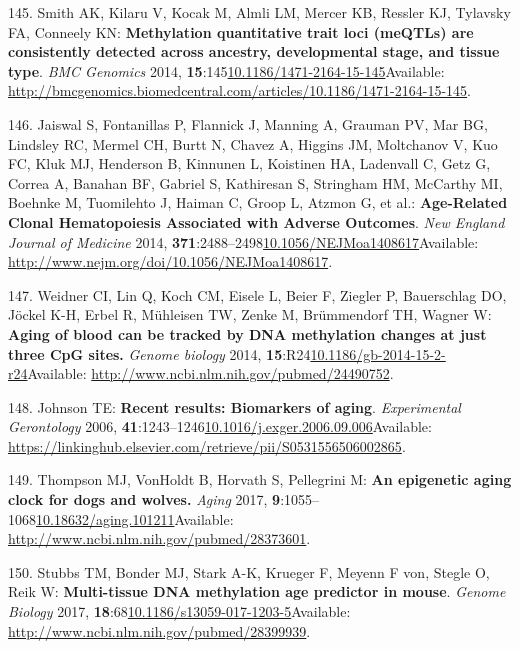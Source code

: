 \documentclass[
]{book}
\begin{document}
\leavevmode\hypertarget{ref-Smith2014a}{}%
145. Smith AK, Kilaru V, Kocak M, Almli LM, Mercer KB, Ressler KJ, Tylavsky FA, Conneely KN: \textbf{Methylation quantitative trait loci (meQTLs) are consistently detected across ancestry, developmental stage, and tissue type}. \emph{BMC Genomics} 2014, \textbf{15}:145\href{https://doi.org/10.1186/1471-2164-15-145}{10.1186/1471-2164-15-145}Available: \url{http://bmcgenomics.biomedcentral.com/articles/10.1186/1471-2164-15-145}.

\leavevmode\hypertarget{ref-Jaiswal2014c}{}%
146. Jaiswal S, Fontanillas P, Flannick J, Manning A, Grauman PV, Mar BG, Lindsley RC, Mermel CH, Burtt N, Chavez A, Higgins JM, Moltchanov V, Kuo FC, Kluk MJ, Henderson B, Kinnunen L, Koistinen HA, Ladenvall C, Getz G, Correa A, Banahan BF, Gabriel S, Kathiresan S, Stringham HM, McCarthy MI, Boehnke M, Tuomilehto J, Haiman C, Groop L, Atzmon G, et al.: \textbf{Age-Related Clonal Hematopoiesis Associated with Adverse Outcomes}. \emph{New England Journal of Medicine} 2014, \textbf{371}:2488--2498\href{https://doi.org/10.1056/NEJMoa1408617}{10.1056/NEJMoa1408617}Available: \url{http://www.nejm.org/doi/10.1056/NEJMoa1408617}.

\leavevmode\hypertarget{ref-Weidner2014}{}%
147. Weidner CI, Lin Q, Koch CM, Eisele L, Beier F, Ziegler P, Bauerschlag DO, Jöckel K-H, Erbel R, Mühleisen TW, Zenke M, Brümmendorf TH, Wagner W: \textbf{Aging of blood can be tracked by DNA methylation changes at just three CpG sites.} \emph{Genome biology} 2014, \textbf{15}:R24\href{https://doi.org/10.1186/gb-2014-15-2-r24}{10.1186/gb-2014-15-2-r24}Available: \url{http://www.ncbi.nlm.nih.gov/pubmed/24490752}.

\leavevmode\hypertarget{ref-Johnson2006}{}%
148. Johnson TE: \textbf{Recent results: Biomarkers of aging}. \emph{Experimental Gerontology} 2006, \textbf{41}:1243--1246\href{https://doi.org/10.1016/j.exger.2006.09.006}{10.1016/j.exger.2006.09.006}Available: \url{https://linkinghub.elsevier.com/retrieve/pii/S0531556506002865}.

\leavevmode\hypertarget{ref-Thompson2017}{}%
149. Thompson MJ, VonHoldt B, Horvath S, Pellegrini M: \textbf{An epigenetic aging clock for dogs and wolves.} \emph{Aging} 2017, \textbf{9}:1055--1068\href{https://doi.org/10.18632/aging.101211}{10.18632/aging.101211}Available: \url{http://www.ncbi.nlm.nih.gov/pubmed/28373601}.

\leavevmode\hypertarget{ref-Stubbs2017}{}%
150. Stubbs TM, Bonder MJ, Stark A-K, Krueger F, Meyenn F von, Stegle O, Reik W: \textbf{Multi-tissue DNA methylation age predictor in mouse}. \emph{Genome Biology} 2017, \textbf{18}:68\href{https://doi.org/10.1186/s13059-017-1203-5}{10.1186/s13059-017-1203-5}Available: \url{http://www.ncbi.nlm.nih.gov/pubmed/28399939}.
\end{document}
